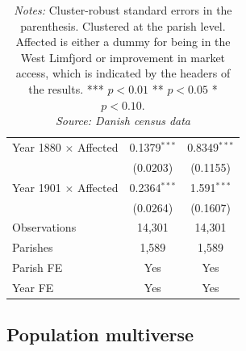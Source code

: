 \begin{table}[H]
\begin{tabular}{lcc}
   Year 1880 $\times$ Affected                       & 0.1379$^{***}$  & 0.8349$^{***}$\\   
                                                     & (0.0203)        & (0.1155)\\   
   Year 1901 $\times$ Affected                       & 0.2364$^{***}$  & 1.591$^{***}$\\   
                                                     & (0.0264)        & (0.1607)\\  
   \midrule
   Observations                                     & 14,301          & 14,301\\
   Parishes                                         & 1,589           & 1,589\\
   \midrule 
   Parish FE                                        & Yes             & Yes\\  
   Year FE                                          & Yes             & Yes\\
   \midrule \midrule
\end{tabular}
\parbox{0.9\textwidth}{
\caption*{\textit{Notes:} Cluster-robust standard errors in the parenthesis. Clustered at the parish level. Affected is either a dummy for being in the West Limfjord or improvement in market access, which is indicated by the headers of the results. *** $p< 0.01$ ** $p< 0.05$ * $p< 0.10$. \\ \textit{Source: Danish census data}}
}
\end{table}


\FloatBarrier
\subsection{Population multiverse} 
\FloatBarrier

